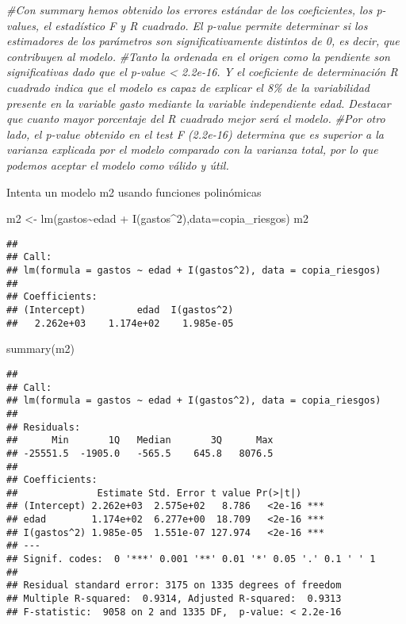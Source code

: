 \documentclass[
]{book}
\newenvironment{Shaded}{\begin{snugshade}}{\end{snugshade}}
\newcommand{\AttributeTok}[1]{\textcolor[rgb]{0.77,0.63,0.00}{#1}}
\newcommand{\CommentTok}[1]{\textcolor[rgb]{0.56,0.35,0.01}{\textit{#1}}}
\newcommand{\DecValTok}[1]{\textcolor[rgb]{0.00,0.00,0.81}{#1}}
\newcommand{\FunctionTok}[1]{\textcolor[rgb]{0.00,0.00,0.00}{#1}}
\newcommand{\NormalTok}[1]{#1}
\newcommand{\OtherTok}[1]{\textcolor[rgb]{0.56,0.35,0.01}{#1}}
\newcommand{\SpecialCharTok}[1]{\textcolor[rgb]{0.00,0.00,0.00}{#1}}
\begin{document}
\begin{Shaded}
\begin{Highlighting}[]
\CommentTok{\#Con summary hemos obtenido los errores estándar de los coeficientes, los p{-}values, el estadístico F y R cuadrado. El p{-}value  permite determinar si los estimadores de los parámetros son significativamente distintos de 0, es decir, que contribuyen al modelo.}
\CommentTok{\#Tanto la ordenada en el origen como la pendiente son significativas dado que el p{-}value \textless{} 2.2e{-}16. Y el coeficiente de determinación R cuadrado indica que el modelo es capaz de explicar el 8\% de la variabilidad presente en la variable gasto mediante la variable independiente edad. Destacar que cuanto mayor porcentaje del R cuadrado mejor será el modelo.}
\CommentTok{\#Por otro lado, el p{-}value obtenido en el test F (2.2e{-}16) determina que es superior a la varianza explicada por el modelo comparado con la varianza total, por lo que podemos aceptar el modelo como válido y útil.}
\end{Highlighting}
\end{Shaded}

Intenta un modelo m2 usando funciones polinómicas

\begin{Shaded}
\begin{Highlighting}[]
\NormalTok{m2 }\OtherTok{\textless{}{-}} \FunctionTok{lm}\NormalTok{(gastos}\SpecialCharTok{\textasciitilde{}}\NormalTok{edad }\SpecialCharTok{+} \FunctionTok{I}\NormalTok{(gastos}\SpecialCharTok{\^{}}\DecValTok{2}\NormalTok{),}\AttributeTok{data=}\NormalTok{copia\_riesgos)}
\NormalTok{m2}
\end{Highlighting}
\end{Shaded}

\begin{verbatim}
## 
## Call:
## lm(formula = gastos ~ edad + I(gastos^2), data = copia_riesgos)
## 
## Coefficients:
## (Intercept)         edad  I(gastos^2)  
##   2.262e+03    1.174e+02    1.985e-05
\end{verbatim}

\begin{Shaded}
\begin{Highlighting}[]
\FunctionTok{summary}\NormalTok{(m2)}
\end{Highlighting}
\end{Shaded}

\begin{verbatim}
## 
## Call:
## lm(formula = gastos ~ edad + I(gastos^2), data = copia_riesgos)
## 
## Residuals:
##      Min       1Q   Median       3Q      Max 
## -25551.5  -1905.0   -565.5    645.8   8076.5 
## 
## Coefficients:
##              Estimate Std. Error t value Pr(>|t|)    
## (Intercept) 2.262e+03  2.575e+02   8.786   <2e-16 ***
## edad        1.174e+02  6.277e+00  18.709   <2e-16 ***
## I(gastos^2) 1.985e-05  1.551e-07 127.974   <2e-16 ***
## ---
## Signif. codes:  0 '***' 0.001 '**' 0.01 '*' 0.05 '.' 0.1 ' ' 1
## 
## Residual standard error: 3175 on 1335 degrees of freedom
## Multiple R-squared:  0.9314, Adjusted R-squared:  0.9313 
## F-statistic:  9058 on 2 and 1335 DF,  p-value: < 2.2e-16
\end{verbatim}
\end{document}
